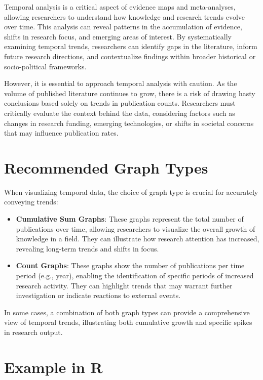 \documentclass[
]{book}
\begin{document}
Temporal analysis is a critical aspect of evidence maps and meta-analyses, allowing researchers to understand how knowledge and research trends evolve over time.
This analysis can reveal patterns in the accumulation of evidence, shifts in research focus, and emerging areas of interest.
By systematically examining temporal trends, researchers can identify gaps in the literature, inform future research directions, and contextualize findings within broader historical or socio-political frameworks.

However, it is essential to approach temporal analysis with caution.
As the volume of published literature continues to grow, there is a risk of drawing hasty conclusions based solely on trends in publication counts.
Researchers must critically evaluate the context behind the data, considering factors such as changes in research funding, emerging technologies, or shifts in societal concerns that may influence publication rates.

\section{Recommended Graph Types}\label{recommended-graph-types}

When visualizing temporal data, the choice of graph type is crucial for accurately conveying trends:

\begin{itemize}
\item
  \textbf{Cumulative Sum Graphs}: These graphs represent the total number of publications over time, allowing researchers to visualize the overall growth of knowledge in a field.
  They can illustrate how research attention has increased, revealing long-term trends and shifts in focus.
\item
  \textbf{Count Graphs}: These graphs show the number of publications per time period (e.g., year), enabling the identification of specific periods of increased research activity.
  They can highlight trends that may warrant further investigation or indicate reactions to external events.
\end{itemize}

In some cases, a combination of both graph types can provide a comprehensive view of temporal trends, illustrating both cumulative growth and specific spikes in research output.

\section{Example in R}\label{example-in-r}
\end{document}
